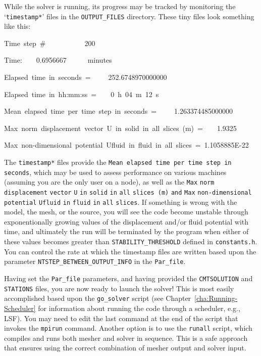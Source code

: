 \documentclass[oneside,english]{book}
\newenvironment{lyxcode}
{\begin{list}{}{
\setlength{\rightmargin}{\leftmargin}
\setlength{\listparindent}{0pt}%
\raggedright
\setlength{\itemsep}{0pt}
\setlength{\parsep}{0pt}
\normalfont\ttfamily}%
 \item[]}
{\end{list}}
\begin{document}
While the solver is running, its progress may be tracked by monitoring
the `\texttt{timestamp{*}}' files in the \texttt{OUTPUT\_FILES} directory.
These tiny files look something like this:

\begin{lyxcode}
Time~step~\#~~~~~~~~~~~200~

Time:~~~~0.6956667~~~~~~minutes~

Elapsed~time~in~seconds~=~~~~~252.6748970000000~

Elapsed~time~in~hh:mm:ss~=~~~~0~h~04~m~12~s~

Mean~elapsed~time~per~time~step~in~seconds~=~~~~~1.263374485000000~

Max~norm~displacement~vector~U~in~solid~in~all~slices~(m)~=~~~~1.9325~

Max~non-dimensional~potential~Ufluid~in~fluid~in~all~slices~=~1.1058885E-22~
\end{lyxcode}
The \texttt{timestamp{*}} files provide the \texttt{Mean elapsed time
per time step in seconds}, which may be used to assess performance
on various machines (assuming you are the only user on a node), as
well as the \texttt{\small Max}{\small{} }\texttt{\small norm}{\small{}
}\texttt{\small displacement}{\small{} }\texttt{\small vector}{\small{}
}\texttt{\small U}{\small{} }\texttt{\small in}{\small{} }\texttt{\small solid}{\small{}
}\texttt{\small in}{\small{} }\texttt{\small all}{\small{} }\texttt{\small slices~(m)}{\small{}
}\texttt{\small and}{\small{} }\texttt{\small Max}{\small{} }\texttt{\small non-dimensional}{\small{}
}\texttt{\small potential}{\small{} }\texttt{\small Ufluid}{\small{}
}\texttt{\small in}{\small{} }\texttt{\small fluid}{\small{} }\texttt{\small in}{\small{}
}\texttt{\small all}{\small{} }\texttt{\small slices}. If something
is wrong with the model, the mesh, or the source, you will see the
code become unstable through exponentionally growing values of the
displacement and/or fluid potential with time, and ultimately the
run will be terminated by the program when either of these values
becomes greater than \texttt{STABILITY\_THRESHOLD} defined in \texttt{constants.h}.
You can control the rate at which the timestamp files are written
based upon the parameter \texttt{NTSTEP\_BETWEEN\_OUTPUT\_INFO} in
the \texttt{Par\_file}.

Having set the \texttt{Par\_file} parameters, and having provided
the \texttt{CMTSOLUTION} and \texttt{STATIONS} files, you are now
ready to launch the solver! This is most easily accomplished based
upon the \texttt{go\_solver} script (see Chapter~\ref{cha:Running-Scheduler}
for information about running the code through a scheduler, e.g.,
LSF). You may need to edit the last command at the end of the script
that invokes the \texttt{mpirun} command. Another option is to use
the \texttt{runall} script, which compiles and runs both mesher and
solver in sequence. This is a safe approach that ensures using the
correct combination of mesher output and solver input.
\end{document}
